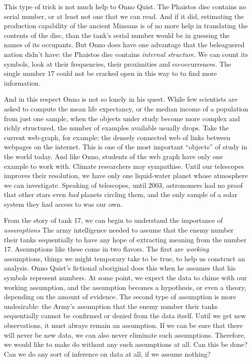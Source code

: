 This type of trick is not much help to Onno Quist. The Phaistos disc contains no serial number, or at least not one that we can read. And if it did, estimating the production capability of the ancient Minoans is of no more help in {translating} the contents of the disc, than the tank's serial number would be in guessing the names of its occupants. But Onno does have one advantage that the beleaguered nation didn't have: the Phaistos disc contains \emph{internal structure}. We can count its symbols, look at their frequencies, their proximities and co-occurrences. The single number 17 could not be cracked open in this way to to find more information.

And in this respect Onno is not so lonely in his quest. While few scientists are asked to compute the mean life expectancy, or the median income of a population from just one sample, when the objects under study become more complex and richly structured, the number of examples available usually drops. Take the current web-graph, for example: the densely connected web of links between webpages on the internet. This is one of the most important ``objects'' of study in the world today. And like Onno, students of the web graph have only one example to work with. Climate researchers may sympathise. Until our telescopes improves their resolution, we have only one liquid-water planet whose atmosphere we can investigate. Speaking of telescopes, until 2003, astronomers had no proof that other stars even \emph{had} planets circling them, and the only sample of a solar system they had access to was our own. 


From the story of tank 17, we can begin to understand the importance of \emph{assumptions} The army intelligence needed to assume that the enemy number their tanks sequentially to have any hope of extracting meaning from the number 17. Assumptions like these come in two flavors. The first are \emph{working} assumptions, things we might temporary take to be true, to help us construct an analysis. Onno Quist's fictional aboriginal does this when he assumes that his symbols represent numbers. At some point, we expect the data to chime with our working assumption, and the assumption becomes a hypothesis, or even a theory, depending on the amount of evidence. The second type of assumption is more undesirable: the Army's assumption that the enemy number their tanks sequentially cannot be confirmed or denied from the data itself. Until we get new observations, it must always remain an assumption. If we can be sure that there will never be new data, we can also never eliminate such assumptions. Therefore, we would like to make do without any such assumptions at all. Can this be done? Can we do any sort of inference on data at all, if we assume nothing?

